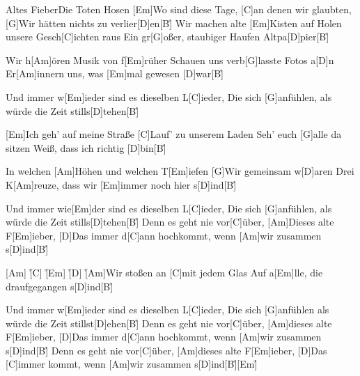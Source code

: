 \documentclass[../main.tex]{subfiles}
\begin{document}
\begin{song}{Altes Fieber}{Die Toten Hosen}{}
[Em]Wo sind diese Tage, [C]an denen wir glaubten,
[G]Wir hätten nichts zu verlier[D]en[B]{\h}
Wir machen alte [Em]Kisten auf
Holen unsere Gesch[C]ichten raus
Ein gr[G]oßer, staubiger Haufen Altpa[D]pier[B]{\h}

Wir h[Am]{ö}ren Musik von f[Em]{r}üher
Schauen uns verb[G]lasste Fotos a[D]n
Er[Am]innern uns, was [Em]mal gewesen [D]war[B]{\h}

Und immer w[Em]ieder sind es dieselben L[C]ieder,
Die sich [G]anfühlen, als würde die Zeit stills[D]tehen[B]{\h}

[Em]Ich geh' auf meine Straße
[C]Lauf' zu unserem Laden
Seh' euch [G]alle da sitzen
Weiß, dass ich richtig [D]bin[B]{\h}

In welchen [Am]Höhen und welchen T[Em]iefen
[G]Wir gemeinsam w[D]aren
Drei K[Am]reuze, dass wir [Em]immer noch hier s[D]ind[B]{\h}

Und immer wie[Em]der sind es dieselben L[C]ieder,
Die sich [G]anfühlen, als würde die Zeit stills[D]tehen[B]{\h}
Denn es geht nie vor[C]{ü}ber, [Am]Dieses alte F[Em]ieber,
[D]Das immer d[C]ann hochkommt, wenn [Am]wir zusammen s[D]ind[B]{\h}

[Am] \h [C] \h [Em] \h [D] \h
[Am]Wir stoßen an [C]mit jedem Glas
Auf a[Em]lle, die draufgegangen s[D]ind[B]{\h}

Und immer w[Em]ieder sind es dieselben L[C]ieder,
Die sich [G]anfühlen als würde die Zeit stillst[D]ehen[B]{\h}
Denn es geht nie vor[C]{ü}ber, [Am]dieses alte F[Em]ieber,
[D]Das immer d[C]ann hochkommt, wenn [Am]wir zusammen s[D]ind[B]{\h}
Denn es geht nie vor[C]{ü}ber, [Am]dieses alte F[Em]ieber,
[D]Das [C]immer kommt, wenn [Am]wir zusammen s[D]ind[B]{\h}[Em]{\h}

\end{song}
\end{document}
